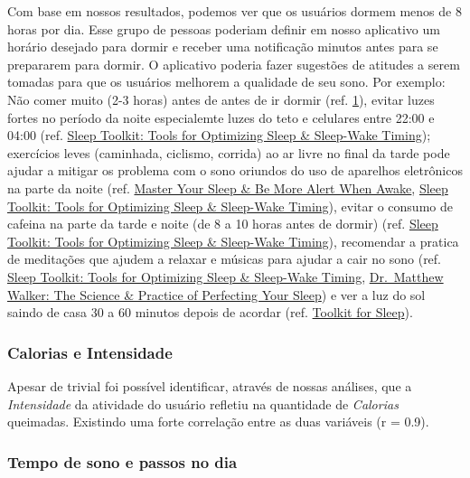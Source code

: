 Com base em nossos resultados, podemos ver que os usuários dormem menos
de 8 horas por dia. Esse grupo de pessoas poderiam definir em nosso
aplicativo um horário desejado para dormir e receber uma notificação
minutos antes para se prepararem para dormir. O aplicativo poderia fazer
sugestões de atitudes a serem tomadas para que os usuários melhorem a
qualidade de seu sono. Por exemplo: Não comer muito (2-3 horas) antes de
antes de ir dormir (ref.
\href{https://health.clevelandclinic.org/is-eating-before-bed-bad-for-you}{1}),
evitar luzes fortes no período da noite especialemte luzes do teto e
celulares entre 22:00 e 04:00 (ref.
\href{https://youtu.be/h2aWYjSA1Jc?t=3733}{Sleep Toolkit: Tools for
    Optimizing Sleep \& Sleep-Wake Timing}); exercícios leves (caminhada,
ciclismo, corrida) ao ar livre no final da tarde pode ajudar a mitigar
os problema com o sono oriundos do uso de aparelhos eletrônicos na parte
da noite (ref. \href{https://youtu.be/nm1TxQj9IsQ?t=2614}{Master Your
    Sleep \& Be More Alert When Awake},
\href{https://youtu.be/h2aWYjSA1Jc?t=3858}{Sleep Toolkit: Tools for
    Optimizing Sleep \& Sleep-Wake Timing}), evitar o consumo de cafeina na
parte da tarde e noite (de 8 a 10 horas antes de dormir) (ref.
\href{https://youtu.be/h2aWYjSA1Jc?t=2272}{Sleep Toolkit: Tools for
    Optimizing Sleep \& Sleep-Wake Timing}), recomendar a pratica de
meditações que ajudem a relaxar e músicas para ajudar a cair no sono
(ref.
\href{https://hubermanlab.com/sleep-toolkit-tools-for-optimizing-sleep-and-sleep-wake-timing/}{Sleep
    Toolkit: Tools for Optimizing Sleep \& Sleep-Wake Timing},
\href{https://youtu.be/gbQFSMayJxk}{Dr.~Matthew Walker: The Science \&
    Practice of Perfecting Your Sleep}) e ver a luz do sol saindo de casa 30
a 60 minutos depois de acordar (ref.
\href{https://hubermanlab.com/toolkit-for-sleep/}{Toolkit for Sleep}).

\subsubsection{Calorias e Intensidade}

Apesar de trivial foi possível identificar, através de nossas análises,
que a \emph{Intensidade} da atividade do usuário refletiu na quantidade
de \emph{Calorias} queimadas. Existindo uma forte correlação entre as
duas variáveis (r = 0.9).

\subsubsection{Tempo de sono e passos no dia}

